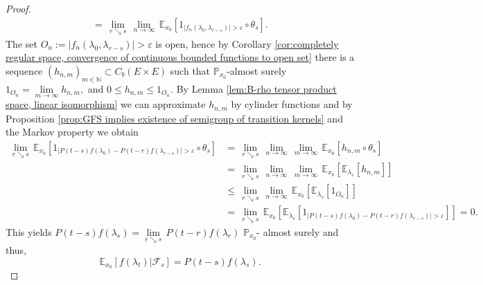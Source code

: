 \documentclass[a4paper,12pt]{article}
\theoremstyle{definition}
\theoremstyle{remark}
\numberwithin{equation}{section}
\numberwithin{theorem}{section}
\begin{document}
\begin{proof}
\begin{align*}
 =\, \underset{r\searrow s}{\lim}\,\underset{n\rightarrow\infty}{\lim}\,\mathbb{E}_{x_{0}}\left[1_{\left|f_{n}(\lambda_{0},\lambda_{r-s})\right|>\varepsilon}\circ\theta_{s}\right].
\end{align*}
The set 
$
O_{n}:=\left|f_{n}(\lambda_{0},\lambda_{r-s})\right|>\varepsilon
$ 
 is open, hence by Corollary \ref{cor:completely regular space, convergence of continuous bounded functions to open set}
there is a sequence $\left(h_{n,m}\right)_{m\in\mathbb{N}}\subset C_{b}\left(E\times E\right)$
such that $\mathbb{P}_{x_{0}}$-almost surely
$
1_{O_{n}} =\underset{m\rightarrow\infty}{\lim}h_{n,m},
$
and $0\leq h_{n,m}\leq1_{O_{n}}.$ By Lemma \ref{lem:B-rho tensor product space, linear isomorphism}
we can approximate $h_{n,m}$ by cylinder functions and by Proposition
\ref{prop:GFS implies existence of semigroup of transition kernels} and the Markov property we obtain
\begin{align*}
  \underset{r\searrow s}{\lim}\,\mathbb{E}_{x_{0}}\left[1_{\left|P\left(t-s\right)f(\lambda_{0})-P\left(t-r\right)f(\lambda_{r-s})\right|>\varepsilon}\circ\theta_{s}\right]
&= \, \underset{r\searrow s}{\lim}\,\underset{n\rightarrow\infty}{\lim}\,\underset{m\rightarrow\infty}{\lim}\,\mathbb{E}_{x_{0}}\left[h_{n,m}\circ\theta_{s}\right]\\
 &=\, \underset{r\searrow s}{\lim}\,\underset{n\rightarrow\infty}{\lim}\,\underset{m\rightarrow\infty}{\lim}\,\mathbb{E}_{x_{0}}\left[\mathbb{E}_{\lambda_{s}}\left[h_{n,m}\right]\right]\\
& \leq\, \underset{r\searrow s}{\lim}\,\underset{n\rightarrow\infty}{\lim}\,\mathbb{E}_{x_{0}}\left[\mathbb{E}_{\lambda_{s}}\left[1_{O_{n}}\right]\right]\\
& =\, \underset{r\searrow s}{\lim}\,\mathbb{E}_{x_{0}}\left[\mathbb{E}_{\lambda_{s}}\left[1_{\left|P\left(t-s\right)f(\lambda_{0})-P\left(t-r\right)f(\lambda_{r-s})\right|>\varepsilon}\right]\right]= 0.
\end{align*}
This yields
$
P\left(t-s\right)f(\lambda_{s})=\underset{r\searrow s}{\lim}\,P\left(t-r\right)f(\lambda_{r})
$
$\mathbb{P}_{x_{0}}$-
almost surely and 
thus, 
\[
\mathbb{E}_{x_{0}}\left[\left.f(\lambda_{t})\right|\mathcal{F}_{s}\right]=P\left(t-s\right)f(\lambda_{s}).
\]


\end{proof}
\end{document}
